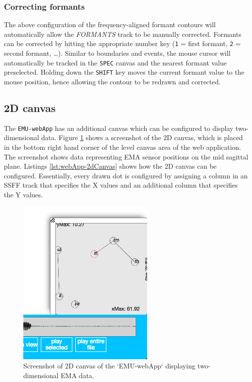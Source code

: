 \documentclass[]{book}
\theoremstyle{definition}
\theoremstyle{definition}
\theoremstyle{definition}
\theoremstyle{remark}
\begin{document}
\hypertarget{correcting-formants}{%
\subsubsection{Correcting formants}\label{correcting-formants}}

The above configuration of the frequency-aligned formant contours will
automatically allow the \emph{FORMANTS} track to be manually corrected.
Formants can be corrected by hitting the appropriate number key
(\texttt{1} = first formant, \texttt{2} = second formant, \ldots{}).
Similar to boundaries and events, the mouse cursor will automatically be
tracked in the \texttt{SPEC} canvas and the nearest formant value
preselected. Holding down the \texttt{SHIFT} key moves the current
formant value to the mouse position, hence allowing the contour to be
redrawn and corrected.

\hypertarget{d-canvas}{%
\subsection{2D canvas}\label{d-canvas}}

The \texttt{EMU-webApp} has an additional canvas which can be configured
to display two-dimensional data. Figure \ref{fig:webApp-2dCanvas} shows
a screenshot of the 2D canvas, which is placed in the bottom right hand
corner of the level canvas area of the web application. The screenshot
shows data representing EMA sensor positions on the mid sagittal plane.
Listings \ref{lst:webApp-2dCanvas} shows how the 2D canvas can be
configured. Essentially, every drawn dot is configured by assigning a
column in an SSFF track that specifies the X values and an additional
column that specifies the Y values.

\begin{figure}

{\centering \includegraphics[width=0.35\linewidth]{pics/emu-webApp2dCanvas} 

}

\caption{Screenshot of 2D canvas of the `EMU-webApp` displaying two-dimensional EMA data.}\label{fig:webApp-2dCanvas}
\end{figure}
\end{document}
